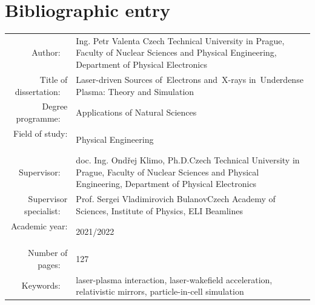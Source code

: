 \documentclass[10pt, a4paper, twoside, openright]{report}
\newcommand{\projecttitle}{Laser-driven Sources of~Electrons and~X-rays in~Underdense Plasma: Theory and Simulation}
\newcommand{\klimo}{doc. Ing. Ondřej Klimo, Ph.D.}
\newcommand{\bulanov}{Prof. Sergei Vladimirovich Bulanov}
\begin{document}
\chapter*{Bibliographic entry}
\thispagestyle{empty}
\begin{flushleft}
	\renewcommand{\arraystretch}{1.5}
	\begin{tabular}{r p{10cm}}
		Author:
		~ & Ing. Petr Valenta \newline Czech Technical University in Prague, Faculty of Nuclear Sciences and Physical Engineering, Department of Physical Electronics \\
		Title of dissertation:
		~ & \projecttitle \\
		Degree programme:
		~ & Applications of Natural Sciences \\
		Field of study:
		~ & Physical Engineering \\
		Supervisor:
		~ & \klimo \newline Czech Technical University in Prague, Faculty of Nuclear Sciences and Physical Engineering, Department of Physical Electronics \\
		Supervisor specialist:
		~ & \bulanov \newline Czech Academy of Sciences, Institute of Physics, ELI Beamlines \\
		Academic year:
		~ & 2021/2022 \\
		Number of pages:
		~ & 127 \\
		Keywords:
		~ & laser-plasma interaction, laser-wakefield acceleration, relativistic mirrors, particle-in-cell simulation \\
	\end{tabular}
\end{flushleft}


\end{document}
